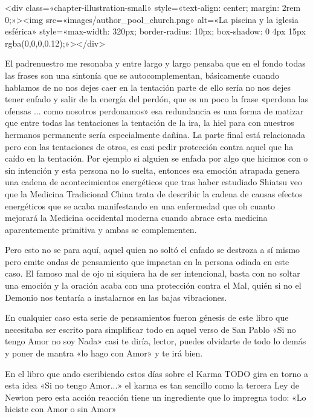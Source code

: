 \documentclass[12pt,twoside,openany]{book}
\begin{document}
<div class=«chapter-illustration-small» style=«text-align: center; margin: 2rem 0;»><img src=«images/author_pool_church.png» alt=«La piscina y la iglesia esférica» style=«max-width: 320px; border-radius: 10px; box-shadow: 0 4px 15px rgba(0,0,0,0.12);»></div>

El padrenuestro me resonaba y entre largo y largo pensaba que en el fondo todas las frases son una sintonía que se autocomplementan, básicamente cuando hablamos de no nos dejes caer en la tentación parte de ello sería no nos dejes tener enfado y salir de la energía del perdón, que es un poco la frase «perdona las ofensas ... como nosotros perdonamos» esa redundancia es una forma de matizar que entre todas las tentaciones la tentación de la ira, la hiel para con nuestros hermanos permanente sería especialmente dañina. La parte final está relacionada pero con las tentaciones de otros, es casi pedir protección contra aquel que ha caído en la tentación. Por ejemplo si alguien se enfada por algo que hicimos con o sin intención y esta persona no lo suelta, entonces esa emoción atrapada genera una cadena de acontecimientos energéticos que tras haber estudiado Shiatsu veo que la Medicina Tradicional China trata de describir la cadena de causas efectos energéticos que se acaba manifestando en una enfermedad que oh cuanto mejorará la Medicina occidental moderna cuando abrace esta medicina aparentemente primitiva y ambas se complementen.

Pero esto no se para aquí, aquel quien no soltó el enfado se destroza a sí mismo pero emite ondas de pensamiento que impactan en la persona odiada en este caso. El famoso mal de ojo ni siquiera ha de ser intencional, basta con no soltar una emoción y la oración acaba con una protección contra el Mal, quién si no el Demonio nos tentaría a instalarnos en las bajas vibraciones. 

En cualquier caso esta serie de pensamientos fueron génesis de este libro que necesitaba ser escrito para simplificar todo en aquel verso de San Pablo «Si no tengo Amor no soy Nada» casi te diría, lector, puedes olvidarte de todo lo demás y poner de mantra «lo hago con Amor» y te irá bien.

En el libro que ando escribiendo estos días sobre el Karma TODO gira en torno a esta idea «Si no tengo Amor...» el karma es tan sencillo como la tercera Ley de Newton pero esta acción reacción tiene un ingrediente que lo impregna todo: «Lo hiciste con Amor o sin Amor» 
\end{document}
